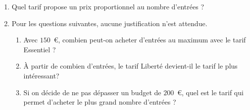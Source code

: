 \begin{enumerate}
La droite ($d_{2}$) représente la fonction correspondant au tarif \og Essentiel\fg.

La droite $(d_{3})$ représente la fonction correspondant au tarif \og Liberté \fg.

\item Quel tarif propose un prix proportionnel au nombre d'entrées ?

\item Pour les questions suivantes, aucune justification n'est attendue.
	\begin{enumerate}
		\item Avec $150$~\euro, combien peut-on acheter d'entrées au maximum avec le tarif \og Essentiel \fg ?

		\item À partir de combien d'entrées, le tarif \og Liberté \fg{} devient-il le tarif le plus intéressant?

		\item Si on décide de ne pas dépasser un budget de $200$~\euro, quel est le tarif qui permet d'acheter le plus grand nombre d'entrées ?
		\end{enumerate}
\end{enumerate}
	
